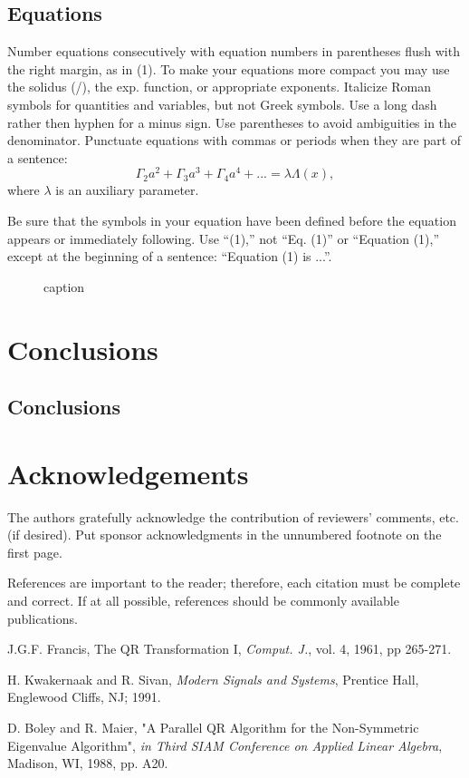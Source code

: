 \documentclass[a4paper, 10pt, conference]{ieeeconf}      %
\begin{document}
\subsection{Equations}

Number equations consecutively with equation numbers in parentheses flush
 with the right margin, as in (1). To make your equations more compact
 you may use the solidus (/), the exp. function, or appropriate exponents.
  Italicize Roman symbols for quantities and variables, but not Greek symbols.
   Use a long dash rather then hyphen for a minus sign. Use parentheses to avoid
    ambiguities in the denominator.
Punctuate equations with commas or periods when they are part of a sentence:
$$\Gamma_2 a^2 + \Gamma_3 a^3 + \Gamma_4 a^4 + ... = \lambda \Lambda(x),$$
where $\lambda$ is an auxiliary parameter.

Be sure that the symbols in your equation have been defined before the
equation appears or immediately following.
Use ``(1),'' not ``Eq. (1)'' or ``Equation (1),''
except at the beginning of a sentence: ``Equation (1) is ...''.

   \begin{figure}[thpb]
      \centering
      \caption{caption}
      \label{figurelabel}
   \end{figure}



\section{Conclusions}

\subsection{Conclusions}





\section{Acknowledgements}

The authors gratefully acknowledge the contribution of reviewers' comments, etc. (if desired). Put sponsor acknowledgments in the unnumbered footnote on the first page.


References are important to the reader; therefore, each citation must be complete and correct. If at all possible, references should be commonly available publications.

\begin{thebibliography}{99}

J.G.F. Francis, The QR Transformation I, {\it Comput. J.}, vol. 4, 1961, pp 265-271.

H. Kwakernaak and R. Sivan, {\it Modern Signals and Systems}, Prentice Hall, Englewood Cliffs, NJ; 1991.

D. Boley and R. Maier, "A Parallel QR Algorithm for the Non-Symmetric Eigenvalue Algorithm", {\it in Third SIAM Conference on Applied Linear Algebra}, Madison, WI, 1988, pp. A20.

\end{thebibliography}
\end{document}
